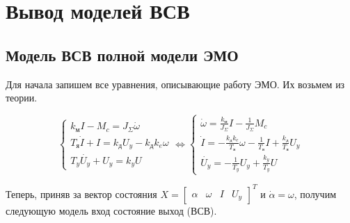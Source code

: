 \documentclass[a4paper, 12pt]{article}
\begin{document}
\newpage
\section{Вывод моделей ВСВ}
\subsection{Модель ВСВ полной модели ЭМО}
Для начала запишем все уравнения, описывающие работу ЭМО. Их возьмем из теории.

\begin{equation}
    \begin{cases}
        k_\text{м}I - M_c = J_\Sigma \dot{\omega} \\
        T_\text{я}\dot{I} + I = k_\text{д}U_y - k_\text{д}k_e\omega \\
        T_y\dot{U_y} + U_y = k_yU
    \end{cases} \Leftrightarrow
    \begin{cases}
        \dot{\omega} = \frac{k_\text{м}}{J_\Sigma}I - \frac{1}{J_\Sigma}M_c \\
        \dot{I} = - \frac{k_\text{д}k_e}{T_\text{я}}\omega - \frac{1}{T_\text{я}}I + \frac{k_\text{д}}{T_\text{я}}U_y \\
        \dot{U_y} = -\frac{1}{T_y}U_y + \frac{k_y}{T_y}U
    \end{cases}
\end{equation} \par
Теперь, приняв за вектор состояния $X = \begin{bmatrix} \alpha & \omega & I & U_y \end{bmatrix}^T$ и $\dot{\alpha} = \omega$, получим следующую модель вход состояние выход (ВСВ).
\end{document}
